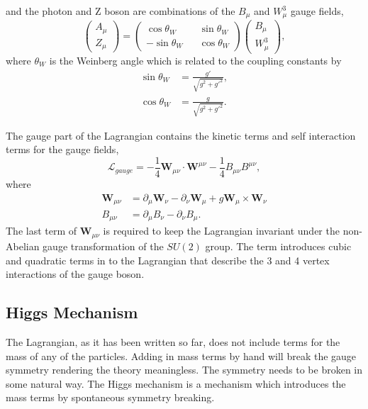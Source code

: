 and the photon and Z boson are combinations of the $B_{\mu}$ and $W^{3}_{\mu}$
gauge fields,
\begin{equation}
\left( \begin{matrix} A_{\mu}\\ Z_{\mu}\end{matrix}\right) =
\left( \begin{matrix} \cos\theta_{W} && \sin\theta_{W} \\  
                      -\sin\theta_{W} && \cos\theta_{W} \end{matrix}\right) 
\left( \begin{matrix} B_{\mu}\\ W^{3}_{\mu}\end{matrix}\right) ,
\label{eq:bgauge}
\end{equation}
where $\theta_{W}$ is the Weinberg angle which is related to the coupling
constants by
\begin{align*}
\sin\theta_{W} &= \frac{g\prime}{\sqrt{g^{2}+g\prime^{2}}},\\
\cos\theta_{W} &= \frac{g}{\sqrt{g^{2}+g\prime^{2}}}.
\end{align*}

The gauge part of the Lagrangian contains the kinetic terms and self interaction
terms for the gauge fields,
\begin{equation}
\mathcal{L}_{gauge} = 
- \frac{1}{4} \mathbf{W}_{\mu\nu} \cdot \mathbf{W}^{\mu\nu}
- \frac{1}{4} B_{\mu\nu} B^{\mu\nu},
\end{equation}
where
\begin{align*}
\mathbf{W}_{\mu\nu} &=
\partial_{\mu} \mathbf{W}_{\nu} -
\partial_{\nu} \mathbf{W}_{\mu} +
g \mathbf{W}_{\mu} \times \mathbf{W}_{\nu}\\
B_{\mu\nu} &= 
\partial_{\mu} B_{\nu}-
\partial_{\nu} B_{\mu}.
\end{align*}
The last term of $\mathbf{W}_{\mu\nu}$ is required to keep the Lagrangian invariant
under the non-Abelian gauge transformation of the $SU(2)$ group. The term
introduces cubic and quadratic terms in to the Lagrangian that describe the 3 and 4
vertex interactions of the gauge boson.

\subsection{Higgs Mechanism}
\label{sec:higgs}
The Lagrangian, as it has been written so far, does not include terms for the
mass of any of the particles. 
Adding in mass terms by hand will break the
gauge symmetry rendering the theory meaningless. The symmetry needs to be broken
in some natural way.
The Higgs mechanism is a mechanism which introduces the mass terms by
spontaneous symmetry breaking.

